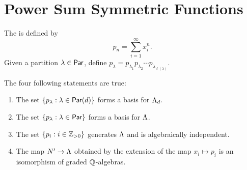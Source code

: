 \section{Power Sum Symmetric Functions}

The  is defined by
\begin{equation}
    p_n = \sum_{i=1}^\infty x_i^n.
\end{equation}
Given a partition \(\lambda \in \operatorname{\mathsf{Par}}\), define \(p_\lambda = p_{\lambda_1}p_{\lambda_2}\cdots p_{\lambda_{\ell(\lambda)}}\).

\begin{theorem} \label{thm:pn_sym}
    The four following statements are true:
    \begin{enumerate}
        \item \label{item:pl_symd_basis}
              The set \(\{p_\lambda : \lambda \in \operatorname{\mathsf{Par}}(d)\}\) forms a basis for \(\operatorname{\Lambda}_d\).
        \item \label{item:pl_sym_basis}
              The set \(\{p_\lambda : \lambda \in \operatorname{\mathsf{Par}}\}\) forms a basis for \(\operatorname{\Lambda}\).
        \item \label{item:pn_sym_generates}
              The set \(\{p_i : i \in \mathbb{Z}_{> 0}\}\) generates \(\operatorname{\Lambda}\) and is algebraically independent.
        \item \label{item:pn_sym_graded_isom}
              The map \(N' \to \operatorname{\Lambda}\) obtained by the extension of the map \(x_i \mapsto p_i\) is an isomorphism of graded \(\mathbb{Q}\)-algebras.
    \end{enumerate}
\end{theorem}

